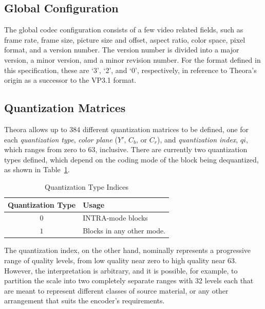 \documentclass[11pt,letterpaper]{book}
\newcommand{\idx}[1]{{\ensuremath{\mathit{#1}}}}
\newcommand{\qi}{\idx{qi}}
\newcommand{\term}[1]{{\em #1}}
\numberwithin{equation}{chapter}
\numberwithin{figure}{chapter}
\numberwithin{table}{chapter}
\begin{document}
\subsection{Global Configuration}

The global codec configuration consists of a few video related fields, such as
 frame rate, frame size, picture size and offset, aspect ratio, color space,
 pixel format, and a version number.
The version number is divided into a major version, a minor version, amd a
 minor revision number.
For the format defined in this specification, these are `3', `2', and
 `0', respectively, in reference to Theora's origin as a successor to the VP3.1
 format.

\subsection{Quantization Matrices}

Theora allows up to 384 different quantization matrices to be defined, one for
 each \term{quantization type}, \term{color plane} ($Y'$, $C_b$, or $C_r$), and
 \term{quantization index}, \qi, which ranges from zero to 63, inclusive.
There are currently two quantization types defined, which depend on the coding
 mode of the block being dequantized, as shown in Table~\ref{tab:quant-types}.

\begin{table}[htb]
\begin{center}
\begin{tabular}{cl}\toprule
Quantization Type & Usage                     \\\midrule
$0$               & INTRA-mode blocks         \\
$1$               & Blocks in any other mode. \\
\bottomrule\end{tabular}
\end{center}
\caption{Quantization Type Indices}
\label{tab:quant-types}
\end{table}

The quantization index, on the other hand, nominally represents a progressive
 range of quality levels, from low quality near zero to high quality near 63.
However, the interpretation is arbitrary, and it is possible, for example, to
 partition the scale into two completely separate ranges with 32 levels each
 that are meant to represent different classes of source material, or any
 other arrangement that suits the encoder's requirements.
\end{document}
